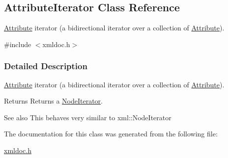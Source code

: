 \hypertarget{classAttributeIterator}{
\subsection{AttributeIterator Class Reference}
\label{classAttributeIterator}
}


\hyperlink{classAttribute}{Attribute} iterator (a bidirectional iterator over a collection of \hyperlink{classAttribute}{Attribute}).  




{\ttfamily \#include $<$xmldoc.h$>$}



\subsubsection{Detailed Description}
\hyperlink{classAttribute}{Attribute} iterator (a bidirectional iterator over a collection of \hyperlink{classAttribute}{Attribute}). \begin{DoxyReturn}{Returns}
Returns a \hyperlink{classNodeIterator}{NodeIterator}.
\end{DoxyReturn}
\begin{DoxySeeAlso}{See also}
This behaves very similar to xml::NodeIterator 
\end{DoxySeeAlso}


The documentation for this class was generated from the following file:\begin{DoxyCompactItemize}
\item 
\hyperlink{xmldoc_8h}{xmldoc.h}\end{DoxyCompactItemize}
